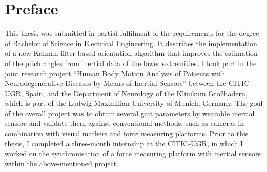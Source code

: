 \chapter{Preface}

This thesis was submitted in partial fulfilment of the requirements for the degree of Bachelor of Science in Electrical Engineering. It describes the implementation of a new Kalman-filter-based orientation algorithm that improves the estimation of the pitch angles from inertial data of the lower extremities. I took part in the joint research project “\mbox{Human} Body Motion Analysis of Patients with Neurodegenerative Diseases by Means of Inertial Sensors” between the \gls{CITIC-UGR}, Spain, and the Department of Neurology of the Klinikum Großhadern, which is part of the Ludwig Maximilian University of \mbox{Munich}, Germany. The goal of the overall project was to obtain several gait parameters by wearable inertial sensors and validate them against conventional methods, such as cameras in combination with visual markers and force measuring platforms. Prior to this thesis, I completed a three-month internship at the \gls{CITIC-UGR}, in which I worked on the synchronisation of a force measuring platform with inertial sensors within the above-mentioned project.